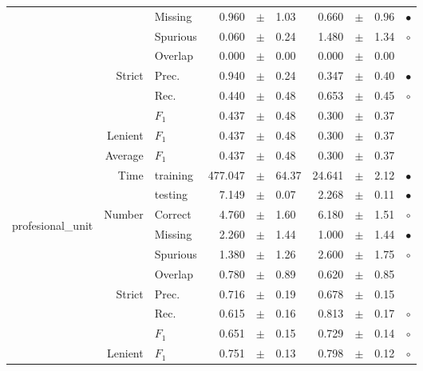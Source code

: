 \begin{longtable}{|r|r|l||rcl|rcl|c|}
\cline{3-10}
  &  &  Missing  & 0.960 &  $\pm$  & 1.03 & 0.660 &  $\pm$  & 0.96 &  $\bullet$\\
\cline{3-10}
  &  &  Spurious  & 0.060 &  $\pm$  & 0.24 & 1.480 &  $\pm$  & 1.34 &  $\circ$\\
\cline{3-10}
  &  &  Overlap  & 0.000 &  $\pm$  & 0.00 & 0.000 &  $\pm$  & 0.00 &   \\
\cline{2-10}
  & \multirow{3}{*}{Strict} &  Prec.  & 0.940 &  $\pm$  & 0.24 & 0.347 &  $\pm$  & 0.40 &  $\bullet$\\
\cline{3-10}
  &  &  Rec.  & 0.440 &  $\pm$  & 0.48 & 0.653 &  $\pm$  & 0.45 &  $\circ$\\
\cline{3-10}
  &  &  $F_1$  & 0.437 &  $\pm$  & 0.48 & 0.300 &  $\pm$  & 0.37 &   \\
\cline{2-10}
  & Lenient &  $F_1$  & 0.437 &  $\pm$  & 0.48 & 0.300 &  $\pm$  & 0.37 &   \\
\cline{2-10}
  & Average &  $F_1$  & 0.437 &  $\pm$  & 0.48 & 0.300 &  $\pm$  & 0.37 &   \\
\cline{2-10}
  & \multirow{2}{*}{Time} &  training  & 477.047 &  $\pm$  & 64.37 & 24.641 &  $\pm$  & 2.12 &  $\bullet$\\
\cline{3-10}
  &  &  testing  & 7.149 &  $\pm$  & 0.07 & 2.268 &  $\pm$  & 0.11 &  $\bullet$\\
\hline
\hline
\multirow{11}{*}{\begin{sideways}profesional\_unit\end{sideways} } & \multirow{4}{*}{Number} &  Correct  & 4.760 &  $\pm$  & 1.60 & 6.180 &  $\pm$  & 1.51 &  $\circ$\\
\cline{3-10}
  &  &  Missing  & 2.260 &  $\pm$  & 1.44 & 1.000 &  $\pm$  & 1.44 &  $\bullet$\\
\cline{3-10}
  &  &  Spurious  & 1.380 &  $\pm$  & 1.26 & 2.600 &  $\pm$  & 1.75 &  $\circ$\\
\cline{3-10}
  &  &  Overlap  & 0.780 &  $\pm$  & 0.89 & 0.620 &  $\pm$  & 0.85 &   \\
\cline{2-10}
  & \multirow{3}{*}{Strict} &  Prec.  & 0.716 &  $\pm$  & 0.19 & 0.678 &  $\pm$  & 0.15 &   \\
\cline{3-10}
  &  &  Rec.  & 0.615 &  $\pm$  & 0.16 & 0.813 &  $\pm$  & 0.17 &  $\circ$\\
\cline{3-10}
  &  &  $F_1$  & 0.651 &  $\pm$  & 0.15 & 0.729 &  $\pm$  & 0.14 &  $\circ$\\
\cline{2-10}
  & Lenient &  $F_1$  & 0.751 &  $\pm$  & 0.13 & 0.798 &  $\pm$  & 0.12 &  $\circ$\\

\end{longtable}
